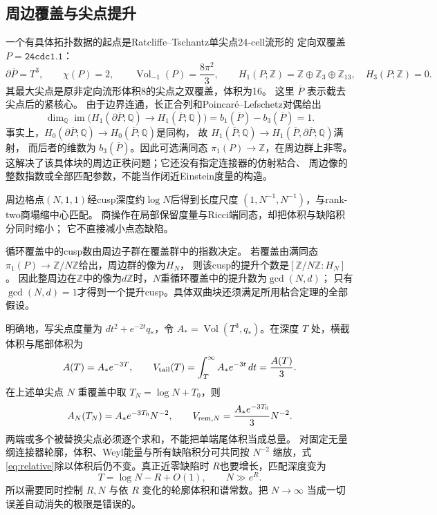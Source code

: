 \documentclass[UTF8,a4paper,11pt,fontset=fandol]{ctexart}
\numberwithin{equation}{section}
\theoremstyle{definition}
\newcommand{\Vol}{\operatorname{Vol}}
\newcommand{\Z}{\mathbb Z}
\begin{document}
\subsection{周边覆盖与尖点提升}
一个有具体拓扑数据的起点是Ratcliffe--Tschantz单尖点24-cell流形的
定向双覆盖 $P=\texttt{24cdc1.1}$\cite[\S\S9,11, Table 2]{RT24}：
\[
 \partial\overline P=T^3,\qquad \chi(P)=2,\qquad
 \Vol_{-1}(P)=\frac{8\pi^2}{3},\qquad
 H_1(P;\Z)=\Z\oplus\Z_3\oplus\Z_{13},\quad H_3(P;\Z)=0.
\]
其最大尖点是原非定向流形体积8的尖点之双覆盖，体积为16。
这里 $\overline P$ 表示截去尖点后的紧核心。
由于边界连通，长正合列和Poincar\'e--Lefschetz对偶给出
\begin{equation}\label{eq:peripheral-rank}
 \dim_{\mathbb Q}\operatorname{im}\bigl(H_1(\partial\overline P;\mathbb Q)
        \longrightarrow H_1(\overline P;\mathbb Q)\bigr)
 =b_1(\overline P)-b_3(\overline P)=1.
\end{equation}
事实上，$H_0(\partial\overline P;\mathbb Q)\to H_0(\overline P;\mathbb Q)$是同构，
故 $H_1(\overline P;\mathbb Q)\to H_1(\overline P,\partial\overline P;\mathbb Q)$满射，
而后者的维数为 $b_3(\overline P)$。因此可选满同态
$\pi_1(P)\to\Z$，在周边群上非零。
这解决了该具体块的周边正秩问题；它还没有指定连接器的仿射粘合、
周边像的整数指数或全部匹配参数，不能当作闭近Einstein度量的构造。

周边格点$(N,1,1)$经cusp深度约$\log N$后得到长度尺度
$(1,N^{-1},N^{-1})$，与rank-two商塌缩中心匹配。
商操作在局部保留度量与Ricci端同态，却把体积与缺陷积分同时缩小；
它不直接减小点态缺陷。

循环覆盖中的cusp数由周边子群在覆盖群中的指数决定。
若覆盖由满同态$\pi_1(P)\to\Z/N\Z$给出，周边群的像为$H_N$，
则该cusp的提升个数是$[\Z/N\Z:H_N]$。
因此整周边在$\Z$中的像为$d\Z$时，$N$重循环覆盖中的提升数为$\gcd(N,d)$；
只有$\gcd(N,d)=1$才得到一个提升cusp。具体双曲块还须满足所用粘合定理的全部假设。

明确地，写尖点度量为 $dt^2+e^{-2t}q_*$，令
$A_*=\Vol(T^3,q_*)$。在深度 $T$ 处，横截体积与尾部体积为
\begin{equation}\label{eq:cusp-tail}
 A(T)=A_*e^{-3T},\qquad
 V_{\rm tail}(T)=\int_T^\infty A_*e^{-3t}\,dt=\frac{A(T)}3.
\end{equation}
在上述单尖点 $N$ 重覆盖中取 $T_N=\log N+T_0$，则
\begin{equation}\label{eq:cusp-cover-scale}
 A_N(T_N)=A_*e^{-3T_0}N^{-2},\qquad
 V_{{\rm rem},N}=\frac{A_*e^{-3T_0}}3N^{-2}.
\end{equation}
两端或多个被替换尖点必须逐个求和，不能把单端尾体积当成总量。
对固定无量纲连接器轮廓，体积、Weyl能量与所有缺陷积分可共同按 $N^{-2}$ 缩放，式\eqref{eq:relative}除以体积后仍不变。真正近零缺陷时 $R$也要增长，匹配深度变为
\begin{equation}\label{eq:RN}
T=\log N-R+O(1),\qquad N\gg e^R.
\end{equation}
所以需要同时控制 $R,N$ 与依 $R$ 变化的轮廓体积和谱常数。把 $N\to\infty$ 当成一切误差自动消失的极限是错误的。
\end{document}
